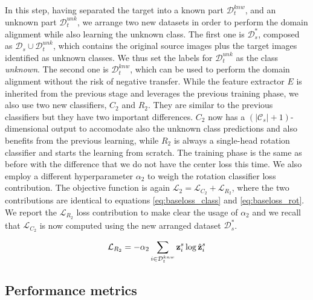 \documentclass[10pt,twocolumn,letterpaper]{article}
\begin{document}
In this step,
having separated the target into a known part $\mathcal{D}_t^{knw}$,
and an unknown part $\mathcal{D}_t^{unk}$,
we arrange two new datasets in order to perform the domain alignment while also learning
the unknown class.
The first one is $\mathcal{D}_s^*$, composed as $\mathcal{D}_s \cup \mathcal{D}_t^{unk}$,
which contains the original source images plus the target images identified as unknown classes.
We thus set the labels for $\mathcal{D}_t^{unk}$ as the class {\it unknown}.
The second one is $\mathcal{D}_t^{knw}$, which can be used to perform the domain alignment
without the risk of negative transfer.
While the feature extractor $E$ is inherited from the previous stage and leverages the previous training phase,
we also use two new classifiers,
$C_2$ and $R_2$.
They are similar to the previous classifiers but they have two important differences.
$C_2$ now has a $(|\mathcal{C}_s|+1)$-dimensional output to accomodate also the unknown class predictions and also
benefits from the previous learning,
while $R_2$ is always a single-head rotation classifier and starts the learning from scratch.
The training phase is the same as before with the difference that we do not have the center loss this time.
We also employ a different hyperparameter $\alpha_2$ to weigh the rotation classifier loss contribution.
The objective function is again $\mathcal{L}_2 = \mathcal{L}_{C_2} + \mathcal{L}_{R_2}$,
where the two contributions are identical to equations \ref{eq:baseloss_class} and \ref{eq:baseloss_rot}.
We report the $\mathcal{L}_{R_2}$ loss contribution to make clear the usage of $\alpha_2$ and we
recall that $\mathcal{L}_{C_2}$ is now computed using the new arranged dataset $\mathcal{D}_s^*$.

\begin{equation}
  \mathcal{L}_{R_2} = -\alpha_2\sum_{i\in\mathcal{D}_t^{knw}} {\bf z}_i^s \log \hat{{\bf z}}_i^s
  \label{eq:baseloss_rot2}
\end{equation}

\subsection{Performance metrics}
\label{sec:performance_metrics}
\end{document}
